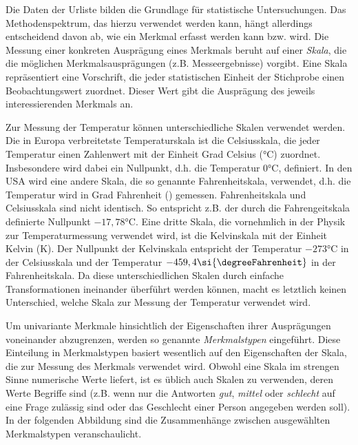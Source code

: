 \documentclass{lecture}
\begin{document}
    Die Daten der Urliste bilden die Grundlage für statistische Untersuchungen.
    Das Methodenspektrum, das hierzu verwendet werden kann, hängt allerdings entscheidend davon ab, wie ein Merkmal erfasst werden kann bzw. wird.
    Die Messung einer konkreten Ausprägung eines Merkmals beruht auf einer \emph{Skala}, die die möglichen Merkmalsausprägungen (z.B. Messeergebnisse) vorgibt.
    Eine Skala repräsentiert eine Vorschrift, die jeder statistischen Einheit der Stichprobe einen Beobachtungswert zuordnet.
    Dieser Wert gibt die Ausprägung des jeweils interessierenden Merkmals an.
    \begin{example}
        Zur Messung der Temperatur können unterschiedliche Skalen verwendet werden.
        Die in Europa verbreitetste Temperaturskala ist die Celsiusskala, die jeder Temperatur einen Zahlenwert mit der Einheit Grad Celsius (\si{\degreeCelsius}) zuordnet.
        Insbesondere wird dabei ein Nullpunkt, d.h. die Temperatur \(0\si{\degreeCelsius}\), definiert.
        In den USA wird eine andere Skala, die so genannte Fahrenheitskala, verwendet, d.h. die Temperatur wird in Grad Fahrenheit (\si{\degreeFahrenheit}) gemessen.
        Fahrenheitskala und Celsiusskala sind nicht identisch.
        So entspricht z.B. der durch die Fahrengeitskala definierte Nullpunkt \(-17,78\si{\degreeCelsius}\).
        Eine dritte Skala, die vornehmlich in der Physik zur Temperaturmessung verwendet wird, ist die Kelvinskala mit der Einheit Kelvin (\si{\kelvin}).
        Der Nullpunkt der Kelvinskala entspricht der Temperatur \(-273\si{\degreeCelsius}\) in der Celsiusskala und der Temperatur \(-459,4\si{\degreeFahrenheit}\) in der Fahrenheitskala.
        Da diese unterschiedlichen Skalen durch einfache Transformationen ineinander überführt werden können, macht es letztlich keinen Unterschied, welche Skala zur Messung der Temperatur verwendet wird.
    \end{example}
    Um univariante Merkmale hinsichtlich der Eigenschaften ihrer Ausprägungen voneinander abzugrenzen, werden so genannte \emph{Merkmalstypen} eingeführt.
    Diese Einteilung in Merkmalstypen basiert wesentlich auf den Eigenschaften der Skala, die zur Messung des Merkmals verwendet wird.
    Obwohl eine Skala im strengen Sinne numerische Werte liefert, ist es üblich auch Skalen zu verwenden, deren Werte Begriffe sind (z.B. wenn nur die Antworten \emph{gut}, \emph{mittel} oder \emph{schlecht} auf eine Frage zulässig sind oder das Geschlecht einer Person angegeben werden soll).
    In der folgenden Abbildung sind die Zusammenhänge zwischen ausgewählten Merkmalstypen veranschaulicht.
\end{document}
